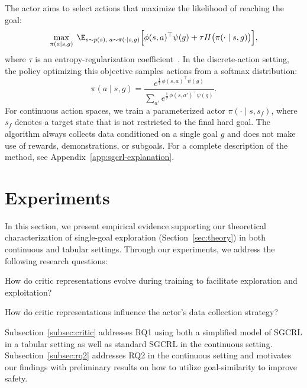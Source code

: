 \documentclass{article}
\begin{document}
The actor aims to select actions that maximize the likelihood of reaching the goal:
\begin{equation}\label{eq:actor-obj}
    \max_{\pi(a \mid s,g)} \;
    \E_{s \sim p(s), \; a \sim \pi(\cdot \mid s,g)}
    \Big[\phi(s,a)^\top \psi(g) + \tau H\big(\pi(\cdot \mid s,g)\big)\Big],
\end{equation}
where $\tau$ is an entropy-regularization coefficient~\citep{williams1991function}. 
In the discrete-action setting, the policy optimizing this objective samples actions from a softmax distribution:
\begin{equation}\label{eq:softmax-actor}
    \pi(a \mid s,g) = \frac{e^{\tfrac{1}{\tau}\,\phi(s,a)^\top \psi(g)}}{\sum_{a'} e^{\tfrac{1}{\tau}\,\phi(s,a')^\top \psi(g)}}.
\end{equation}
For continuous action spaces, we train a parameterized actor $\pi(\cdot \mid s,s_f)$, where $s_f$ denotes a target state that is not restricted to the final hard goal. %
The algorithm always collects data conditioned on a single goal $g$ and does not make use of rewards, demonstrations, or subgoals. For a complete description of the method, see Appendix~\ref{app:sgcrl-explanation}.




\section{Experiments}\label{sec:experiments}
In this section, we present empirical evidence supporting our theoretical characterization of single-goal exploration (Section~\ref{sec:theory}) in both continuous and tabular settings. Through our experiments, we address the following research questions: 

\begin{description}[leftmargin=2em]
    \item[RQ1.] How do critic representations evolve during training to facilitate exploration and exploitation?
    \item[RQ2.] How do critic representations influence the actor's data collection strategy?
\end{description}

Subsection~\ref{subsec:critic} addresses RQ1 using both a simplified model of SGCRL in a tabular setting as well as standard SGCRL in the continuous setting. Subsection~\ref{subsec:rq2} addresses RQ2 in the continuous setting and motivates our findings with preliminary results on how to utilize goal-similarity to improve safety. 
\end{document}
